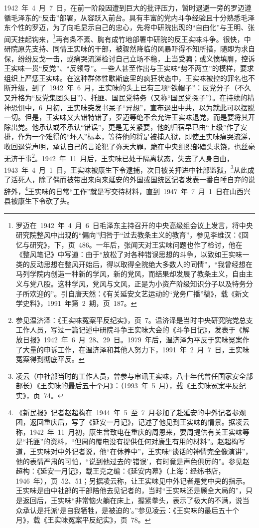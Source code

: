 1942~年~4~月~7~日，在前一阶段因遭到巨大的批评压力，暂时退避一旁的罗迈遵循毛泽东的“反击”部署，从容跃入前台。具有丰富的党内斗争经验且十分熟悉毛泽东个性的罗迈，为了向毛显示自己的忠心，先将中研院出现的“自由化”与王明、张闻天挂起钩来，\footnote{罗迈在~1942~年~4~月~6~日毛泽东主持召开的中央高级组会议上发言，将中央研究院整风中出现的“偏向”归咎于“过去教条主义的教育”，参见李维汉：《回忆与研究》，下，页~486。一年后，张闻天对王实味问题也作了检讨，他在《整风笔记》中写道：由于“放松了对各种错误思想的斗争，以致如王实味一类的反动思想在整风开始后，得以取得全院绝大多数人的同情”，“我曾经想在马列学院内创造一种新的学风，新的党风，而结果却发展了教条主义，自由主义与党八股。这种学风，党风与文风，正是为小资产阶级知识分子以及特务分子所欢迎的”。引自唐天然：《有关延安文艺运动的“党务广播”稿》，载《新文学史料》，1991~年第~2~期，页~187。}再有条不紊、胸有成竹地部署中研院的反王实味斗争。很快，中研院原先支持、同情王实味的干部，被骤然降临的风暴吓得不知所措，随即为求自保，纷纷反戈一击，或痛哭流涕检讨自己立场不稳，上当受骗；或义愤填膺，控诉王实味一贯“反党”、“反领导”。一些人甚至作出与王实味“势不两立”的模样，要求组织上严惩王实味。在这种群体性歇斯底里的疯狂状态中，王实味被控的罪名也不断升级，到了~1942~年~6~月，王实味的头上已有三项“铁帽子”：反党分子（不久又升格为“反党集团头目”）、托匪、国民党特务（又称“国民党探子”）。在持续的精神恐惧中，6~月初，王实味突发书呆子“异想”，宣布退出中共，以为就此可以摆脱一切。但是，王实味又大错特错了，罗迈等绝不会允许王实味退党，而是要将其开除出党。他承认或不承认“错误”，更是无关紧要，他的归宿早已由“上级”作了安排，作为一个难得的“坏人”标本，等待他的将是被捕入狱，即使王实味痛哭流涕，收回退党声明，承认自己的言论犯了弥天大罪，跪在中央组织部磕头求饶，也丝毫无济于事\footnote{参见温济泽：《王实味冤案平反纪实》，页~7。温济泽是当时中央研究院党总支工作人员，写过一篇记述中研院斗争王实味大会的《斗争日记》，发表于《解放日报》1942~年~6~月~28、29~日。1979~年后，温济泽为平反于实味冤案作了大量的申诉工作，在温济泽和其他人努力下，1991~年~2~月~7~日，王实味冤案得到彻底平反。}。1942~年~11~月后，王实味已处于隔离状态，失去了人身自由，1943~年~4~月~1~日，王实味被康生下令逮捕，次日被关押进中社部监狱，\footnote{凌云（中社部当时的工作人员，曾参与审讯王实味，八十年代曾任国家安全部部长）《王实味的最后五十个月》：（1993~年~5~月），载《王实味冤案平反纪实》，页~74。}从此成了活死人，除了偶而被带出来向来延安的外国或国统区记者发表一番自唾自弃的说辞外，\footnote{《新民报》记者赵超构在~1944~年~5~至~7~月参加了赴延安的中外记者参观团，返回重庆后，写了《延安一月记》，记述了他见到王实味的情景。据凌云称，1942~年~11~月初，康生曾致电在重庆的周恩来，要周提供有关王实味等是“托匪”的资料，“但周的覆电没有提供任何对康生有用的材料”。赵超构写道，王实味对中外记者说，他“在休养中”，王实味“谈话的神情完全像演讲”，他的表情严肃的可怕，“说到他过去的‘错误’，有时竟是声色俱厉的”。参见赵超构：《延安一月记》，载王克之编：《延安内幕》（上海：经纬书店，1946~年），页~52、51；另据凌云称，让王实味见中外记者是党中央的指示。王实味是由中社部的干部陪他去见记者的，当时“王实味还是顾全大局的”，只是返回后，王实味“非常恼火躺在床上，握紧拳头，表示了极大的不满，说当众承认是托派‘是自我牺牲，是被迫的’。”参见凌云：《王实味的最后五十个月》，载《王实味冤案平反纪实》，页~78。}王实味的日常“工作”就是写交待材料，直到~1947~年~7~月~1~日在山西兴县被康生下令砍了头。

